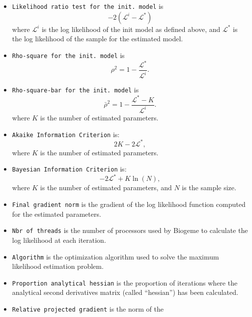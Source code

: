 \documentclass[12pt,a4paper]{article}
\begin{document}
\begin{itemize}
      \item \texttt{Likelihood ratio test for the init. model} is 
         \begin{equation}
            -2 ( \mathcal{L}^i - \mathcal{L}^*)
         \end{equation}
         where 
         $ \mathcal{L}^i$ is the log likelihood of the init model
         as defined above, and $\mathcal{L}^*$ is the log likelihood of the sample for the estimated model. 
      \item \texttt{Rho-square for the init. model} is
         \begin{equation}
            \rho^2 = 1 - \frac{\mathcal{L}^*}{\mathcal{L}^i}.
         \end{equation}
        \item \texttt{Rho-square-bar for the init. model} is
         \begin{equation}
            \bar{\rho}^2 = 1 - \frac{\mathcal{L}^* - K}{\mathcal{L}^i}.
         \end{equation}
         where $K$ is the number of estimated parameters.
       \item \texttt{Akaike Information Criterion} is:
         \begin{equation}
          2 K - 2 \mathcal{L}^*,
         \end{equation}
         where $K$ is the number of estimated parameters.
       \item \texttt{Bayesian Information Criterion} is:
         \begin{equation}
 - 2 \mathcal{L}^* + K \ln(N),
         \end{equation}
         where  $K$ is the number of estimated parameters, and $N$ is
         the sample size. 
      \item \texttt{Final gradient norm} is the gradient of the log
        likelihood function computed for the estimated parameters.
      \item \texttt{Nbr of threads} is the number of processors used
        by Biogeme to calculate the log likelihood at each iteration.
       \item \texttt{Algorithm} is the optimization algorithm used to
         solve the maximum likelihood estimation problem.
        \item \texttt{Proportion analytical hessian} is the proportion
          of iterations where the analytical second derivatives matrix
          (called ``hessian'') has been calculated.
         \item \texttt{Relative projected gradient} is the norm of the

\end{itemize}
\end{document}
